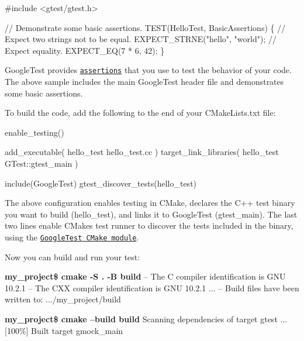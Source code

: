 \begin{DoxyCode}
\textcolor{preprocessor}{#include <gtest/gtest.h>}

\textcolor{comment}{// Demonstrate some basic assertions.}
TEST(HelloTest, BasicAssertions) \{
  \textcolor{comment}{// Expect two strings not to be equal.}
  EXPECT\_STRNE(\textcolor{stringliteral}{"hello"}, \textcolor{stringliteral}{"world"});
  \textcolor{comment}{// Expect equality.}
  EXPECT\_EQ(7 * 6, 42);
\}
\end{DoxyCode}


Google\+Test provides \href{primer.md#assertions}{\tt assertions} that you use to test the behavior of your code. The above sample includes the main Google\+Test header file and demonstrates some basic assertions.

To build the code, add the following to the end of your {\ttfamily C\+Make\+Lists.\+txt} file\+:


\begin{DoxyCode}
enable\_testing()

add\_executable(
  hello\_test
  hello\_test.cc
)
target\_link\_libraries(
  hello\_test
  GTest::gtest\_main
)

include(GoogleTest)
gtest\_discover\_tests(hello\_test)
\end{DoxyCode}


The above configuration enables testing in C\+Make, declares the C++ test binary you want to build ({\ttfamily hello\+\_\+test}), and links it to Google\+Test ({\ttfamily gtest\+\_\+main}). The last two lines enable C\+Make\textquotesingle{}s test runner to discover the tests included in the binary, using the \href{https://cmake.org/cmake/help/git-stage/module/GoogleTest.html}{\tt {\ttfamily Google\+Test} C\+Make module}.

Now you can build and run your test\+:


\begin{DoxyPre}
{\bfseries my\_project\$ cmake -S . -B build}
-- The C compiler identification is GNU 10.2.1
-- The CXX compiler identification is GNU 10.2.1
...
-- Build files have been written to: .../my\_project/build\end{DoxyPre}



\begin{DoxyPre}{\bfseries my\_project\$ cmake --build build}
Scanning dependencies of target gtest
...
[100\%] Built target gmock\_main\end{DoxyPre}



